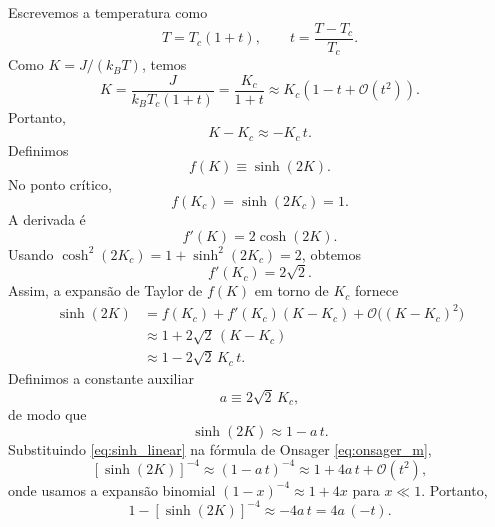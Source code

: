\documentclass[11pt,a4paper]{article}
\begin{document}
% 
Escrevemos a temperatura como
%
\begin{equation}
    T = T_c(1+t),
    \qquad
    t = \frac{T-T_c}{T_c}.
\end{equation}
%
Como \(K = J/(k_B T)\), temos
%
\begin{equation}
    K = \frac{J}{k_B T_c(1+t)}
    = \frac{K_c}{1+t}
    \approx K_c\left(1 - t + \mathcal O(t^2)\right).
    \label{eq:K_expansion}
\end{equation}
%
Portanto,
%
\begin{equation}
    K - K_c \approx -K_c\,t.
    \label{eq:K_difference}
\end{equation}
%
Definimos
%
\begin{equation}
    f(K) \equiv \sinh(2K).
\end{equation}
%
No ponto crítico,
%
\begin{equation}
    f(K_c) = \sinh(2K_c) = 1.
\end{equation}
%
A derivada é
%
\begin{equation}
    f'(K) = 2\cosh(2K).
\end{equation}
%
Usando \(\cosh^2(2K_c) = 1 + \sinh^2(2K_c) = 2\), obtemos
%
\begin{equation}
    f'(K_c) = 2\sqrt{2}.
\end{equation}
%
Assim, a expansão de Taylor de \(f(K)\) em torno de \(K_c\) fornece
%
\begin{align}
    \sinh(2K)
    &= f(K_c) + f'(K_c)(K-K_c) + \mathcal O\big((K-K_c)^2\big) \nonumber\\
    &\approx 1 + 2\sqrt{2}\,(K-K_c) \nonumber\\
    &\approx 1 - 2\sqrt{2}\,K_c\,t.
    \label{eq:sinh_expansion}
\end{align}
%
Definimos a constante auxiliar
%
\begin{equation}
    a \equiv 2\sqrt{2}\,K_c,
    \label{eq:a_def}
\end{equation}
%
de modo que
%
\begin{equation}
    \sinh(2K) \approx 1 - a\,t.
    \label{eq:sinh_linear}
\end{equation}
%
Substituindo \eqref{eq:sinh_linear} na fórmula de Onsager \eqref{eq:onsager_m},
\begin{equation}
    \left[\sinh(2K)\right]^{-4}
    \approx (1 - a\,t)^{-4}
    \approx 1 + 4a\,t + \mathcal O(t^2),
    \label{eq:sinh_power}
\end{equation}
%
onde usamos a expansão binomial \((1-x)^{-4} \approx 1 + 4x\) para \(x \ll 1\). Portanto,
%
\begin{equation}
    1 - \left[\sinh(2K)\right]^{-4}
    \approx -4a\,t
    = 4a\,(-t).
    \label{eq:argument_m}
\end{equation}
\end{document}
